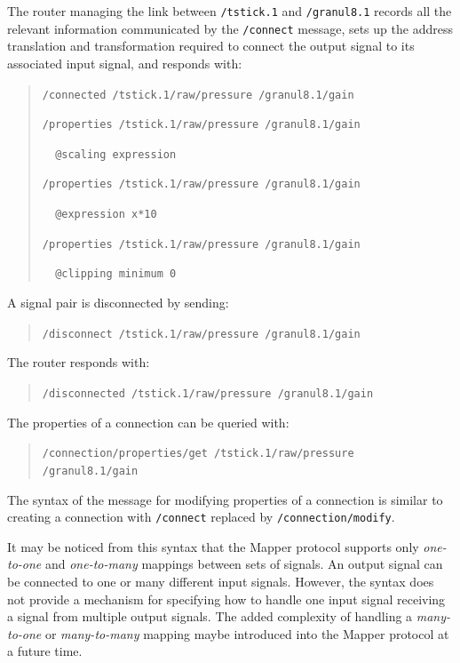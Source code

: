 The router managing the link between \verb#/tstick.1# and \verb#/granul8.1# records all the relevant information communicated by the \verb#/connect# message, sets up the address translation and transformation required to connect the output signal to its associated input signal, and responds with:

\begin{quote}
\verb#/connected /tstick.1/raw/pressure /granul8.1/gain#

\verb#/properties /tstick.1/raw/pressure /granul8.1/gain#

\verb#  @scaling expression#

\verb#/properties /tstick.1/raw/pressure /granul8.1/gain#

\verb#  @expression x*10#

\verb#/properties /tstick.1/raw/pressure /granul8.1/gain#

\verb#  @clipping minimum 0#
\end{quote}

A signal pair is disconnected by sending:

\begin{quote}
\verb#/disconnect /tstick.1/raw/pressure /granul8.1/gain#
\end{quote}

The router responds with:

\begin{quote}
\verb#/disconnected /tstick.1/raw/pressure /granul8.1/gain#
\end{quote}

The properties of a connection can be queried with:

\begin{quote}
\verb#/connection/properties/get /tstick.1/raw/pressure /granul8.1/gain#
\end{quote}

The syntax of the message for modifying properties of a connection is similar to creating a connection with \verb#/connect# replaced by \verb#/connection/modify#.

It may be noticed from this syntax that the Mapper protocol supports only \emph{one-to-one} and \emph{one-to-many} mappings between sets of signals. An output signal can be connected to one or many different input signals. However, the syntax does not provide a mechanism for specifying how to handle one input signal receiving a signal from multiple output signals. The added complexity of handling a \emph{many-to-one} or \emph{many-to-many} mapping maybe introduced into the Mapper protocol at a future time.

